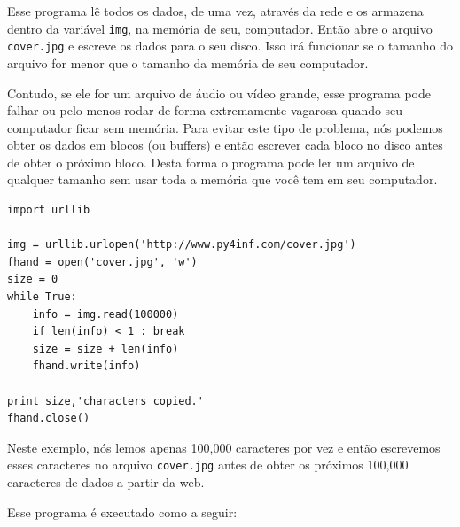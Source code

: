 Esse programa lê todos os dados, de uma vez, através da rede e os armazena
dentro da variável {\tt img}, na memória de seu, computador. Então abre o
arquivo {\tt cover.jpg} e escreve os dados para o seu disco.  Isso irá
funcionar se o tamanho do arquivo for menor que o tamanho da memória de seu
computador.

Contudo, se ele for um arquivo de áudio ou vídeo grande, esse programa pode
falhar ou pelo menos rodar de forma extremamente vagarosa quando seu computador
ficar sem memória.  Para evitar este tipo de problema, nós podemos obter os
dados em blocos (ou buffers) e então escrever cada bloco no disco antes de
obter o próximo bloco.  Desta forma o programa pode ler um arquivo de qualquer
tamanho sem usar toda a memória que você tem em seu computador.

\beforeverb
\begin{verbatim}
import urllib

img = urllib.urlopen('http://www.py4inf.com/cover.jpg')
fhand = open('cover.jpg', 'w')
size = 0
while True:
    info = img.read(100000)
    if len(info) < 1 : break
    size = size + len(info)
    fhand.write(info)

print size,'characters copied.'
fhand.close()
\end{verbatim}
\afterverb

Neste exemplo, nós lemos apenas 100,000 caracteres por vez e então escrevemos
esses caracteres no arquivo {\tt cover.jpg} antes de obter os próximos 100,000
caracteres de dados a partir da web.

Esse programa é executado como a seguir:

